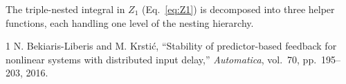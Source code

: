 \documentclass[11pt]{article}
\begin{document}
The triple-nested integral in $Z_1$ (Eq.~\ref{eq:Z1}) is decomposed into three helper functions, each handling one level of the nesting hierarchy.

\begin{thebibliography}{1}
N. Bekiaris-Liberis and M. Krsti\'{c}, ``Stability of predictor-based feedback for nonlinear systems with distributed input delay,'' \emph{Automatica}, vol.~70, pp.~195--203, 2016.
\end{thebibliography}
\end{document}
